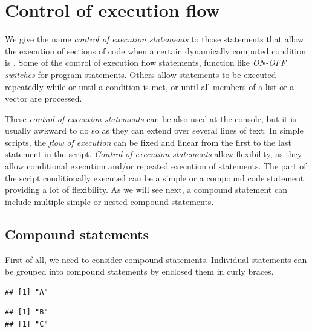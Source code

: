\documentclass[krantz2]{krantz}\usepackage{knitr}
\begin{document}
\section{Control of execution flow}\label{sec:script:flow:control}
We give the name \emph{control of execution statements} to those statements that allow the execution of sections of code when a certain dynamically computed condition is . Some of the control of execution flow statements, function like \emph{ON-OFF switches} for program statements. Others allow statements to be executed repeatedly while or until a condition is met, or until all members of a list or a vector are processed.

These \emph{control of execution statements} can be also used at the \Rlang console, but it is usually awkward to do so as they can extend over several lines of text. In simple scripts, the \emph{flow of execution} can be fixed and linear from the first to the last statement in the script. \emph{Control of execution statements} allow flexibility, as they allow conditional execution  and/or repeated execution of statements. The part of the script conditionally executed can be a simple or a compound code statement providing a lot of flexibility. As we will see next, a compound statement can include multiple simple or nested compound statements.

\subsection{Compound statements}

First of all, we need to consider compound statements. Individual statements can be grouped into compound statements by enclosed them in curly braces.

\begin{knitrout}\footnotesize
{}\color{fgcolor}\begin{kframe}
\begin{alltt}
\hlstd{(}\hlstd{)}
\end{alltt}
\begin{verbatim}
## [1] "A"
\end{verbatim}
\begin{alltt}
\hlstd{\{}
  \hlstd{(}\hlstd{)}
  \hlstd{(}\hlstd{)}
\hlstd{\}}
\end{alltt}
\begin{verbatim}
## [1] "B"
## [1] "C"
\end{verbatim}
\end{kframe}
\end{knitrout}
\end{document}
